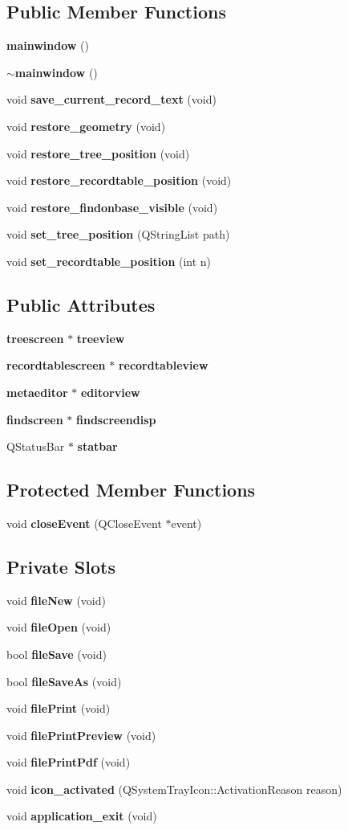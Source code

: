 \subsection*{Public Member Functions}
\begin{CompactItemize}
\item 
{\bf mainwindow} ()
\item 
{\bf $\sim$mainwindow} ()
\item 
void {\bf save\_\-current\_\-record\_\-text} (void)
\item 
void {\bf restore\_\-geometry} (void)
\item 
void {\bf restore\_\-tree\_\-position} (void)
\item 
void {\bf restore\_\-recordtable\_\-position} (void)
\item 
void {\bf restore\_\-findonbase\_\-visible} (void)
\item 
void {\bf set\_\-tree\_\-position} (QString\-List path)
\item 
void {\bf set\_\-recordtable\_\-position} (int n)
\end{CompactItemize}
\subsection*{Public Attributes}
\begin{CompactItemize}
\item 
{\bf treescreen} $\ast$ {\bf treeview}
\item 
{\bf recordtablescreen} $\ast$ {\bf recordtableview}
\item 
{\bf metaeditor} $\ast$ {\bf editorview}
\item 
{\bf findscreen} $\ast$ {\bf findscreendisp}
\item 
QStatus\-Bar $\ast$ {\bf statbar}
\end{CompactItemize}
\subsection*{Protected Member Functions}
\begin{CompactItemize}
\item 
void {\bf close\-Event} (QClose\-Event $\ast$event)
\end{CompactItemize}
\subsection*{Private Slots}
\begin{CompactItemize}
\item 
void {\bf file\-New} (void)
\item 
void {\bf file\-Open} (void)
\item 
bool {\bf file\-Save} (void)
\item 
bool {\bf file\-Save\-As} (void)
\item 
void {\bf file\-Print} (void)
\item 
void {\bf file\-Print\-Preview} (void)
\item 
void {\bf file\-Print\-Pdf} (void)
\item 
void {\bf icon\_\-activated} (QSystem\-Tray\-Icon::Activation\-Reason reason)
\item 
void {\bf application\_\-exit} (void)
\end{CompactItemize}
